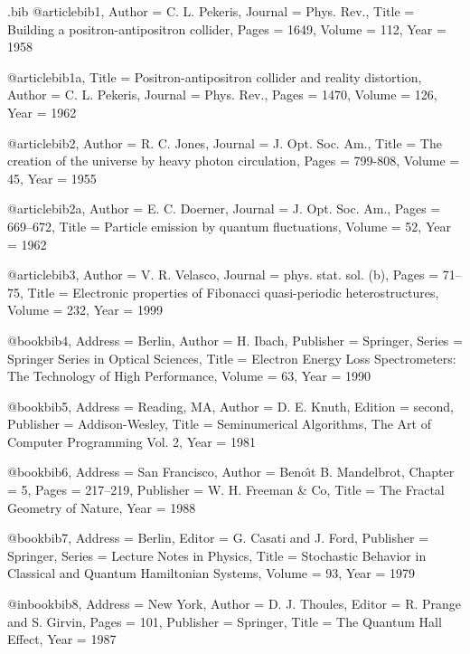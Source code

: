 \edef\bstname{mlq-title-unsrt}
\begin{filecontents*}{\jobname.bib}
@article{bib1,
    Author = {C. L. Pekeris},
    Journal = {Phys. Rev.},
    Title = {Building a positron-antipositron collider},
    Pages = {1649},
    Volume = {112},
    Year = {1958}}

@article{bib1a,
    Title = {Positron-antipositron collider and reality distortion},
    Author = {C. L. Pekeris},
    Journal = {Phys. Rev.},
    Pages = {1470},
    Volume = {126},
    Year = {1962}}

@article{bib2,
    Author = {R. C. Jones},
    Journal = {J. Opt. Soc. Am.},
    Title = {The creation of the universe by heavy photon circulation},
    Pages = {799-808},
    Volume = {45},
    Year = {1955}}

@article{bib2a,
    Author = {E. C. Doerner},
    Journal = {J. Opt. Soc. Am.},
    Pages = {669--672},
    Title = {Particle emission by quantum fluctuations},
    Volume = {52},
    Year = {1962}}

@article{bib3,
    Author = {V. R. Velasco},
    Journal = {phys. stat. sol. (b)},
    Pages = {71--75},
    Title = {Electronic properties of {Fibonacci} quasi-periodic heterostructures},
    Volume = {232},
    Year = {1999}}

@book{bib4,
    Address = {Berlin},
    Author = {H. Ibach},
    Publisher = {Springer},
    Series = {Springer Series in Optical Sciences},
    Title = {Electron Energy Loss Spectrometers: The Technology of High Performance},
    Volume = {63},
    Year = {1990}}

@book{bib5,
    Address = {Reading, MA},
    Author = {D. E. Knuth},
    Edition = {second},
    Publisher = {Addison-Wesley},
    Title = {Seminumerical Algorithms, The Art of Computer Programming Vol. 2},
    Year = {1981}}

@book{bib6,
    Address = {San Francisco},
    Author = {Beno{\^{\i}}t B. Mandelbrot},
    Chapter = {5},
    Pages = {217--219},
    Publisher = {W. H. Freeman {\&} Co},
    Title = {The Fractal Geometry of Nature},
    Year = {1988}}

@book{bib7,
    Address = {Berlin},
    Editor = {G. Casati and J. Ford},
    Publisher = {Springer},
    Series = {Lecture Notes in Physics},
    Title = {Stochastic Behavior in Classical and Quantum Hamiltonian Systems},
    Volume = {93},
    Year = {1979}}

@inbook{bib8,
    Address = {New York},
    Author = {D. J. Thoules},
    Editor = {R. Prange and S. Girvin},
    Pages = {101},
    Publisher = {Springer},
    Title = {The Quantum Hall Effect},
    Year = {1987}}


\end{filecontents*}
